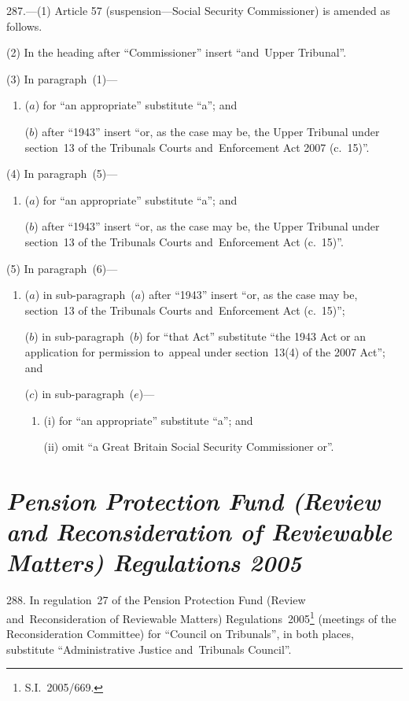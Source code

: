 \documentclass[12pt,a4paper]{article}
\begin{document}
\medskip

287.---(1)  Article 57 (suspension---Social Security Commissioner) is amended as follows.

(2) In the heading after “Commissioner” insert “and~Upper Tribunal”.

(3) In paragraph~(1)—
\begin{enumerate}\item[]
($a$) for “an appropriate” substitute “a”; and

($b$) after “1943” insert “or, as the case may be, the Upper Tribunal under section~13 of the Tribunals Courts and~Enforcement Act 2007 (c.~15)”.
\end{enumerate}

(4) In paragraph~(5)—
\begin{enumerate}\item[]
($a$) for “an appropriate” substitute “a”; and

($b$) after “1943” insert “or, as the case may be, the Upper Tribunal under section~13 of the Tribunals Courts and~Enforcement Act (c.~15)”.
\end{enumerate}

(5) In paragraph~(6)—
\begin{enumerate}\item[]
($a$) in sub-paragraph~($a$)  after “1943” insert “or, as the case may be, section~13 of the Tribunals Courts and~Enforcement Act (c.~15)”;

($b$) in sub-paragraph~($b$)  for “that Act” substitute “the 1943 Act or an application for permission to~appeal under section~13(4) of the 2007 Act”; and

($c$) in sub-paragraph~($e$)—
\begin{enumerate}\item[]
(i) for “an appropriate” substitute “a”; and

(ii) omit “a Great Britain Social Security Commissioner or”.
\end{enumerate}
\end{enumerate}

\section*{\itshape\sloppy Pension Protection Fund (Review and Reconsideration of Reviewable Matters) Regulations 2005}

288.  In regulation~27 of the Pension Protection Fund (Review and~Reconsideration of Reviewable Matters) Regulations~2005\footnote{S.I.~2005/669.} (meetings of the Reconsideration Committee) for “Council on Tribunals”, in both places, substitute “Administrative Justice and~Tribunals Council”.
\end{document}
